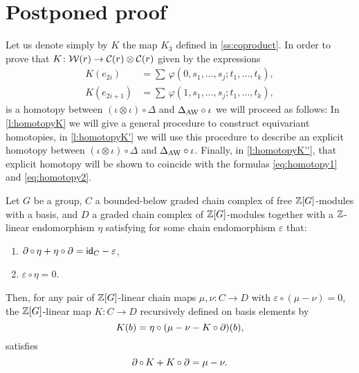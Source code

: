 
\section{Postponed proof}\label{s:postponed}

Let us denote simply by $K$ the map $K_3$ defined in \cref{ss:coproduct}.
In order to prove that $K \colon \mathcal{W}(r) \to \mathcal{C}(r) \otimes \mathcal{C}(r)$ given by the expressions
\begin{align}
	\label{eq:homotopy1}
	K(e_{2i})   &= \sum \, \varphi(0,s_1,\dots,s_j;t_1,\dots,t_k), \\
	\label{eq:homotopy2}
	K(e_{2i+1}) &= \sum \, \varphi(1,s_1,\dots,s_j;t_1,\dots,t_k),
\end{align}
is a homotopy between $(\iota\otimes \iota)\circ \Delta$ and $\Delta_{\operatorname{AW}}\circ \iota$ we will proceed as follows: In \cref{l:homotopyK} we will give a general procedure to construct equivariant homotopies, in \cref{l:homotopyK'} we will use this procedure to describe an explicit homotopy between $(\iota\otimes \iota)\circ \Delta$ and $\Delta_{\operatorname{AW}}\circ \iota$.
Finally, in \cref{l:homotopyK''}, that explicit homotopy will be shown to coincide with the formulas \eqref{eq:homotopy1} and \eqref{eq:homotopy2}.

\begin{lemma}\label{l:homotopyK}
	Let $G$ be a group, $C$ a bounded-below graded chain complex of free $\mathbb{Z}[G]$-modules with a basis, and $D$ a graded chain complex of $\mathbb{Z}[G]$-modules together with a $\mathbb{Z}$-linear endomorphism $\eta$ satisfying for some chain endomorphism $\varepsilon$ that:
	\begin{enumerate}
		\item $\operatorname{\partial} \circ \, \eta + \eta \circ \operatorname{\partial} = \mathsf{id}_C - \varepsilon$,
		\item $\varepsilon\circ \eta = 0$.
	\end{enumerate}
	Then, for any pair of $\mathbb{Z}[G]$-linear chain maps $\mu,\nu \colon C \to D$ with $\varepsilon \circ (\mu-\nu) = 0$, the $\mathbb{Z}[G]$-linear map $K \colon C \to D$ recursively defined on basis elements by
	\[
	K(b) = \eta \circ (\mu - \nu - K \circ \operatorname{\partial})(b),
	\]
	satisfies
	\[
	\operatorname{\partial} \circ \, K + K \circ \operatorname{\partial} = \mu - \nu.
	\]
\end{lemma}

